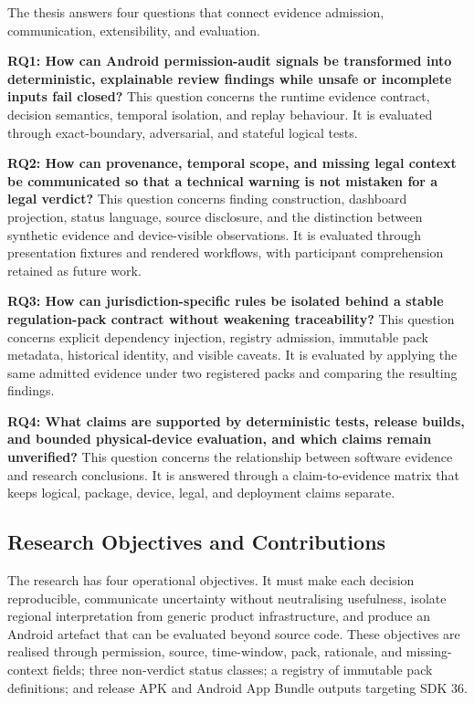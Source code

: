 The thesis answers four questions that connect evidence admission, communication, extensibility, and evaluation.

\textbf{RQ1: How can Android permission-audit signals be transformed into deterministic, explainable review findings while unsafe or incomplete inputs fail closed?} This question concerns the runtime evidence contract, decision semantics, temporal isolation, and replay behaviour. It is evaluated through exact-boundary, adversarial, and stateful logical tests.

\textbf{RQ2: How can provenance, temporal scope, and missing legal context be communicated so that a technical warning is not mistaken for a legal verdict?} This question concerns finding construction, dashboard projection, status language, source disclosure, and the distinction between synthetic evidence and device-visible observations. It is evaluated through presentation fixtures and rendered workflows, with participant comprehension retained as future work.

\textbf{RQ3: How can jurisdiction-specific rules be isolated behind a stable regulation-pack contract without weakening traceability?} This question concerns explicit dependency injection, registry admission, immutable pack metadata, historical identity, and visible caveats. It is evaluated by applying the same admitted evidence under two registered packs and comparing the resulting findings.

\textbf{RQ4: What claims are supported by deterministic tests, release builds, and bounded physical-device evaluation, and which claims remain unverified?} This question concerns the relationship between software evidence and research conclusions. It is answered through a claim-to-evidence matrix that keeps logical, package, device, legal, and deployment claims separate.

\subsection{Research Objectives and Contributions}

The research has four operational objectives. It must make each decision reproducible, communicate uncertainty without neutralising usefulness, isolate regional interpretation from generic product infrastructure, and produce an Android artefact that can be evaluated beyond source code. These objectives are realised through permission, source, time-window, pack, rationale, and missing-context fields; three non-verdict status classes; a registry of immutable pack definitions; and release APK and Android App Bundle outputs targeting SDK 36.

